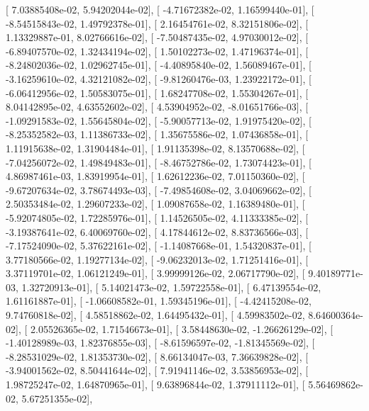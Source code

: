 \documentclass{article}
\begin{document}
       [  7.03885408e-02,   5.94202044e-02],
       [ -4.71672382e-02,   1.16599440e-01],
       [ -8.54515843e-02,   1.49792378e-01],
       [  2.16454761e-02,   8.32151806e-02],
       [  1.13329887e-01,   8.02766616e-02],
       [ -7.50487435e-02,   4.97030012e-02],
       [ -6.89407570e-02,   1.32434194e-02],
       [  1.50102273e-02,   1.47196374e-01],
       [ -8.24802036e-02,   1.02962745e-01],
       [ -4.40895840e-02,   1.56089467e-01],
       [ -3.16259610e-02,   4.32121082e-02],
       [ -9.81260476e-03,   1.23922172e-01],
       [ -6.06412956e-02,   1.50583075e-01],
       [  1.68247708e-02,   1.55304267e-01],
       [  8.04142895e-02,   4.63552602e-02],
       [  4.53904952e-02,  -8.01651766e-03],
       [ -1.09291583e-02,   1.55645804e-02],
       [ -5.90057713e-02,   1.91975420e-02],
       [ -8.25352582e-03,   1.11386733e-02],
       [  1.35675586e-02,   1.07436858e-01],
       [  1.11915638e-02,   1.31904484e-01],
       [  1.91135398e-02,   8.13570688e-02],
       [ -7.04256072e-02,   1.49849483e-01],
       [ -8.46752786e-02,   1.73074423e-01],
       [  4.86987461e-03,   1.83919954e-01],
       [  1.62612236e-02,   7.01150360e-02],
       [ -9.67207634e-02,   3.78674493e-03],
       [ -7.49854608e-02,   3.04069662e-02],
       [  2.50353484e-02,   1.29607233e-02],
       [  1.09087658e-02,   1.16389480e-01],
       [ -5.92074805e-02,   1.72285976e-01],
       [  1.14526505e-02,   4.11333385e-02],
       [ -3.19387641e-02,   6.40069760e-02],
       [  4.17844612e-02,   8.83736566e-03],
       [ -7.17524090e-02,   5.37622161e-02],
       [ -1.14087668e-01,   1.54320837e-01],
       [  3.77180566e-02,   1.19277134e-02],
       [ -9.06232013e-02,   1.71251416e-01],
       [  3.37119701e-02,   1.06121249e-01],
       [  3.99999126e-02,   2.06717790e-02],
       [  9.40189771e-03,   1.32720913e-01],
       [  5.14021473e-02,   1.59722558e-01],
       [  6.47139554e-02,   1.61161887e-01],
       [ -1.06608582e-01,   1.59345196e-01],
       [ -4.42415208e-02,   9.74760818e-02],
       [  4.58518862e-02,   1.64495432e-01],
       [  4.59983502e-02,   8.64600364e-02],
       [  2.05526365e-02,   1.71546673e-01],
       [  3.58448630e-02,  -1.26626129e-02],
       [ -1.40128989e-03,   1.82376855e-03],
       [ -8.61596597e-02,  -1.81345569e-02],
       [ -8.28531029e-02,   1.81353730e-02],
       [  8.66134047e-03,   7.36639828e-02],
       [ -3.94001562e-02,   8.50441644e-02],
       [  7.91941146e-02,   3.53856953e-02],
       [  1.98725247e-02,   1.64870965e-01],
       [  9.63896844e-02,   1.37911112e-01],
       [  5.56469862e-02,   5.67251355e-02],
\end{document}
